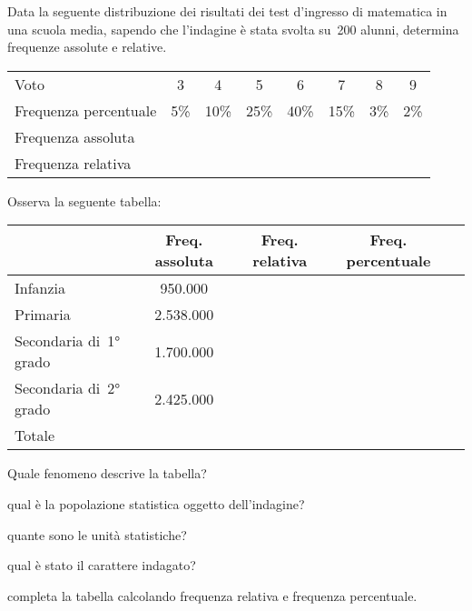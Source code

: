 \begin{esercizio}
\label{ese:A.6}
Data la seguente distribuzione dei risultati dei test d'ingresso di matematica in una scuola media, sapendo che l'indagine è stata svolta su~200 alunni, determina frequenze assolute e relative.
\begin{center}
 \begin{tabularx}{.9\textwidth}{Xccccccc}
\toprule
Voto & 3 & 4 & 5 & 6 & 7 & 8 & 9 \\
Frequenza percentuale & 5\% & 10\% & 25\% & 40\% & 15\% & 3\% & 2\% \\
Frequenza assoluta & & & & & & & \\
Frequenza relativa & & & & & & & \\
\bottomrule
\end{tabularx}
\end{center}
\end{esercizio}

\begin{esercizio}
\label{ese:A.7}
Osserva la seguente tabella:
 \begin{center}
 \begin{tabularx}{.92\textwidth}{Xcccc}
\toprule
 & Freq. assoluta & Freq. relativa & Freq. percentuale \\
\midrule
Infanzia & 950.000 & & \\
Primaria & 2.538.000 & & \\
Secondaria di~1° grado & 1.700.000 & & \\
Secondaria di~2° grado & 2.425.000 & & \\
Totale & & & \\
\bottomrule
\end{tabularx}
 \end{center}
\begin{itemize*}
\item Quale fenomeno descrive la tabella?
\item qual è la popolazione statistica oggetto dell'indagine?
\item quante sono le unità statistiche?
\item qual è stato il carattere indagato?
\item completa la tabella calcolando frequenza relativa e frequenza percentuale.
\end{itemize*}
\end{esercizio}

